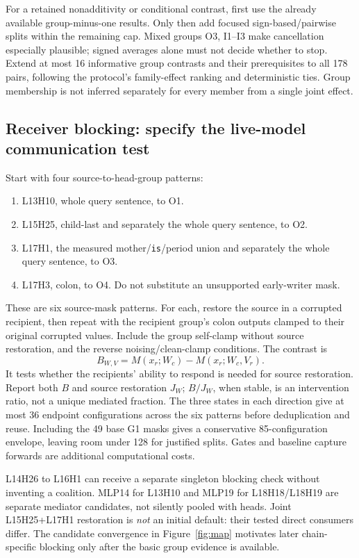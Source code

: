 \documentclass[11pt,a4paper]{article}
\begin{document}
For a retained nonadditivity or conditional contrast, first use the already available group-minus-one results. Only then add focused sign-based/pairwise splits within the remaining cap. Mixed groups O3, I1--I3 make cancellation especially plausible; signed averages alone must not decide whether to stop. Extend at most 16 informative group contrasts and their prerequisites to all 178 pairs, following the protocol's family-effect ranking and deterministic ties. Group membership is not inferred separately for every member from a single joint effect.

\subsection{Receiver blocking: specify the live-model communication test}
Start with four source-to-head-group patterns:
\begin{enumerate}
\item L13H10, whole query sentence, to O1.
\item L15H25, child-last and separately the whole query sentence, to O2.
\item L17H1, the measured mother/\texttt{is}/period union and separately the whole query sentence, to O3.
\item L17H3, colon, to O4. Do not substitute an unsupported early-writer mask.
\end{enumerate}
These are six source-mask patterns. For each, restore the source in a corrupted recipient, then repeat with the recipient group's colon outputs clamped to their original corrupted values. Include the group self-clamp without source restoration, and the reverse noising/clean-clamp conditions. The contrast is
\[
 B_{W,V}=M(x_r;W_c)-M(x_r;W_c,V_r).
\]
It tests whether the recipients' ability to respond is needed for source restoration. Report both $B$ and source restoration $J_W$; $B/J_W$, when stable, is an intervention ratio, not a unique mediated fraction. The three states in each direction give at most 36 endpoint configurations across the six patterns before deduplication and reuse. Including the 49 base G1 masks gives a conservative 85-configuration envelope, leaving room under 128 for justified splits. Gates and baseline capture forwards are additional computational costs.

L14H26 to L16H1 can receive a separate singleton blocking check without inventing a coalition. MLP14 for L13H10 and MLP19 for L18H18/L18H19 are separate mediator candidates, not silently pooled with heads. Joint L15H25+L17H1 restoration is \emph{not} an initial default: their tested direct consumers differ. The candidate convergence in Figure~\ref{fig:map} motivates later chain-specific blocking only after the basic group evidence is available.
\end{document}
